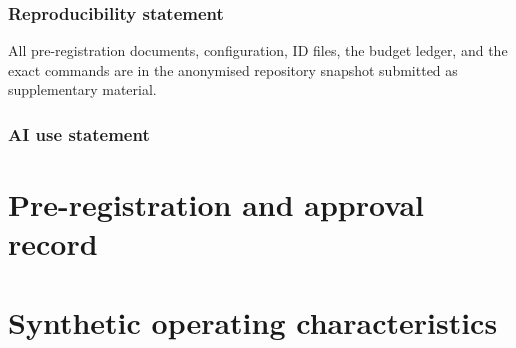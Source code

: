 \documentclass{article}
\newif\ifdraftmode
\newcommand{\draftnote}[1]{\ifdraftmode{\color{red}\textbf{[DRAFT: #1]}}\else\PackageError{main}{draftnote left in submission build: #1}{}\fi}
\begin{document}
\subsubsection*{Reproducibility statement}
All pre-registration documents, configuration, ID files, the budget ledger, and the exact commands are in the anonymised repository
snapshot submitted as supplementary material. \draftnote{Anonymise paths, run ids, and remove the git remote before zipping; check PDF
metadata.}

\subsubsection*{AI use statement}
\draftnote{Required section (not counted). Fill per ICLR 2027 AI Policy for Authors: generative AI tools were used to draft code,
tests and text under the authors' direction; all code was tested and all claims were checked against artifacts by the authors. The
authors must confirm this wording themselves.}




\appendix
\section{Pre-registration and approval record}
\draftnote{Reproduce PREREG\_pilot\_v4.md config block and APPROVAL.json fields (anonymised).}
\section{Synthetic operating characteristics}
\draftnote{Full table from pilot\_power\_v4.md, three quantities (a)/(b)/(c) kept separate; aggregated truth-bin rows without CIs.}
\end{document}
